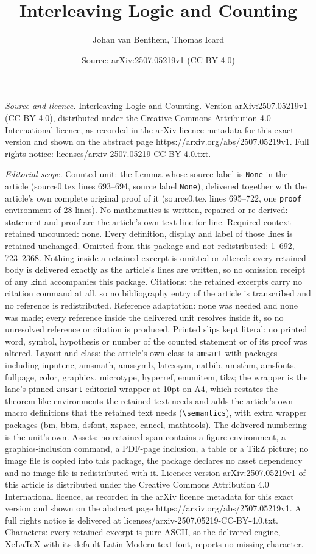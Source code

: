 \documentclass[10pt,a4paper]{amsart}
\title[Interleaving Logic and Counting]{Interleaving Logic and Counting}
\author{Johan van Benthem, Thomas Icard}
\date{Source: arXiv:2507.05219v1 (CC BY 4.0)}
\begin{document}
\maketitle

\noindent\emph{Source and licence.} Interleaving Logic and Counting. Version arXiv:2507.05219v1 (CC BY 4.0), distributed under the Creative Commons Attribution 4.0 International licence, as recorded in the arXiv licence metadata for this exact version and shown on the abstract page https://arxiv.org/abs/2507.05219v1. Full rights notice: licenses/arxiv-2507.05219-CC-BY-4.0.txt.\par\smallskip

\noindent\textit{Editorial scope.} Counted unit: the Lemma whose source label is \texttt{None} in the article (source0.tex lines 693--694, source label \texttt{None}), delivered together with the article's own complete original proof of it (source0.tex lines 695--722, one \texttt{proof} environment of 28 lines). No mathematics is written, repaired or re-derived: statement and proof are the article's own text line for line. Required context retained uncounted: none. Every definition, display and label of those lines is retained unchanged. Omitted from this package and not redistributed: 1--692, 723--2368. Nothing inside a retained excerpt is omitted or altered: every retained body is delivered exactly as the article's lines are written, so no omission receipt of any kind accompanies this package. Citations: the retained excerpts carry no citation command at all, so no bibliography entry of the article is transcribed and no reference is redistributed. Reference adaptation: none was needed and none was made; every reference inside the delivered unit resolves inside it, so no unresolved reference or citation is produced. Printed slips kept literal: no printed word, symbol, hypothesis or number of the counted statement or of its proof was altered. Layout and class: the article's own class is \texttt{amsart} with packages including inputenc, amsmath, amssymb, latexsym, natbib, amsthm, amsfonts, fullpage, color, graphicx, microtype, hyperref, enumitem, tikz; the wrapper is the lane's pinned \texttt{amsart} editorial wrapper at 10pt on A4, which restates the theorem-like environments the retained text needs and adds the article's own macro definitions that the retained text needs (\texttt{\textbackslash semantics}), with extra wrapper packages (bm, bbm, dsfont, xspace, cancel, mathtools). The delivered numbering is the unit's own. Assets: no retained span contains a figure environment, a graphics-inclusion command, a PDF-page inclusion, a table or a TikZ picture; no image file is copied into this package, the package declares no asset dependency and no image file is redistributed with it. Licence: version arXiv:2507.05219v1 of this article is distributed under the Creative Commons Attribution 4.0 International licence, as recorded in the arXiv licence metadata for this exact version and shown on the abstract page https://arxiv.org/abs/2507.05219v1. A full rights notice is delivered at licenses/arxiv-2507.05219-CC-BY-4.0.txt. Characters: every retained excerpt is pure ASCII, so the delivered engine, XeLaTeX with its default Latin Modern text font, reports no missing character.
\end{document}
